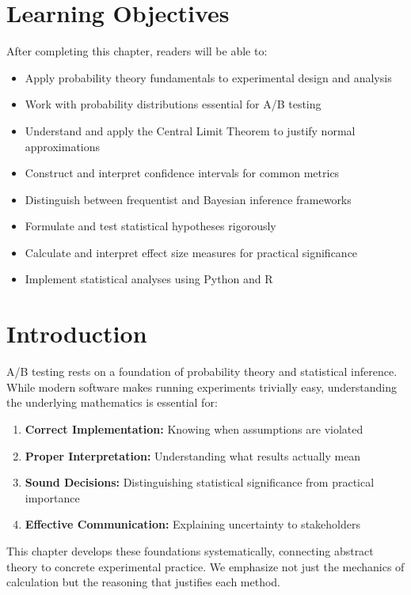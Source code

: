 \section{Learning Objectives}

After completing this chapter, readers will be able to:
\begin{itemize}
    \item Apply probability theory fundamentals to experimental design and analysis
    \item Work with probability distributions essential for A/B testing
    \item Understand and apply the Central Limit Theorem to justify normal approximations
    \item Construct and interpret confidence intervals for common metrics
    \item Distinguish between frequentist and Bayesian inference frameworks
    \item Formulate and test statistical hypotheses rigorously
    \item Calculate and interpret effect size measures for practical significance
    \item Implement statistical analyses using Python and R
\end{itemize}

\section{Introduction}

A/B testing rests on a foundation of probability theory and statistical inference. While modern software makes running experiments trivially easy, understanding the underlying mathematics is essential for:

\begin{enumerate}
    \item \textbf{Correct Implementation:} Knowing when assumptions are violated
    \item \textbf{Proper Interpretation:} Understanding what results actually mean
    \item \textbf{Sound Decisions:} Distinguishing statistical significance from practical importance
    \item \textbf{Effective Communication:} Explaining uncertainty to stakeholders
\end{enumerate}

This chapter develops these foundations systematically, connecting abstract theory to concrete experimental practice. We emphasize not just the mechanics of calculation but the reasoning that justifies each method.

